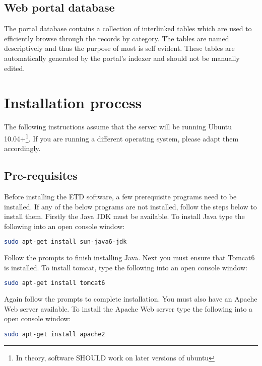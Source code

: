 \documentclass[a4paper,11pt]{article}
\begin{document}
\subsection{Web portal database}

The portal database contains a collection of interlinked tables which are used to efficiently browse through the records by category. The tables are named descriptively and thus the purpose of most is self evident. These tables are automatically generated by the portal's indexer and should not be manually edited.

\section{Installation process}

The following instructions assume that the server will be running Ubuntu 10.04+\footnote{In theory, software SHOULD work on later versions of ubuntu}. If you are running a different operating system, please adapt them accordingly.

\subsection{Pre-requisites}

Before installing the ETD software, a few prerequisite programs need to be installed. If any of the below programs are not installed, follow the steps below to install them. Firstly the Java JDK must be available. To install Java type the following into an open console window: 

\begin{lstlisting}[language=bash]
 sudo apt-get install sun-java6-jdk
\end{lstlisting}


Follow the prompts to finish installing Java. Next you must ensure that Tomcat6 is installed. To install tomcat, type the following into an open console window: 

\begin{lstlisting}[language=bash]
 sudo apt-get install tomcat6
\end{lstlisting}


Again follow the prompts to complete installation. You must also have an Apache Web server available. To install the Apache Web server type the following into a open console window: 

\begin{lstlisting}[language=bash]
 sudo apt-get install apache2
\end{lstlisting}
\end{document}
